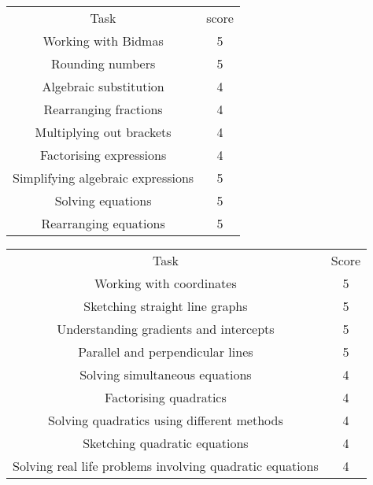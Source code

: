\documentclass[a4paper]{tufte-handout}
\begin{document}
\begin{question}
\qpart

\vspace{4cm}

\qpart
\qsubpart
\begin{tabular}{|c|c|}
\hline
Task & score\\
Working with Bidmas&5\\ \hline
Rounding numbers&5\\ \hline
Algebraic substitution&4\\ \hline
Rearranging fractions&4\\ \hline
Multiplying out brackets&4\\ \hline
Factorising expressions&4\\ \hline
Simplifying algebraic expressions&5\\ \hline
Solving equations&5\\ \hline
Rearranging equations&5\\ \hline
\end{tabular}

\qsubpart
\begin{tabular}{|c|c|}
\hline
Task & Score\\
Working with coordinates&5\\ \hline
Sketching straight line graphs&5\\ \hline
Understanding gradients and intercepts&5\\ \hline
Parallel and perpendicular lines&5\\ \hline
Solving simultaneous equations&4\\ \hline
Factorising quadratics&4\\ \hline
Solving quadratics using different methods&4\\ \hline
Sketching quadratic equations&4\\ \hline
Solving real life problems involving quadratic equations&4\\ \hline
\end{tabular}

\end{question}
\end{document}
